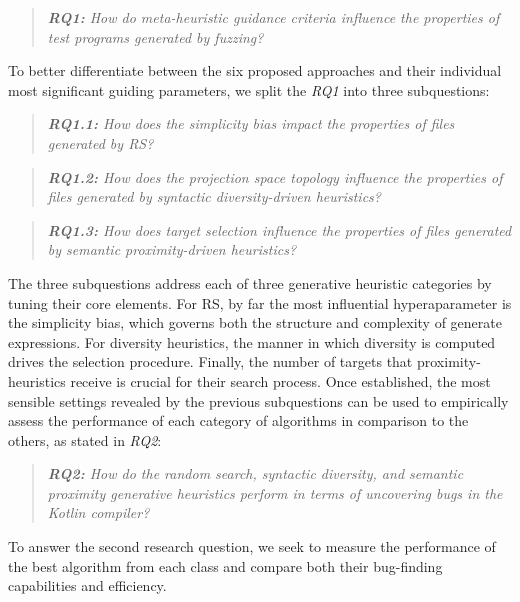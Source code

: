 \begin{quote}
\centering 
\emph{\textbf{RQ1:} How do meta-heuristic guidance
criteria influence the properties of test programs
generated by fuzzing?}
\end{quote}

To better differentiate between the six proposed approaches and their
individual most significant guiding parameters, we split the \textit{RQ1}
into three subquestions:

\begin{quote}
\centering 
\emph{\textbf{RQ1.1:} How does the simplicity bias
impact the properties of files generated by \gls{RS}?}
\end{quote}

\begin{quote}
\centering 
\emph{\textbf{RQ1.2:} How does the projection space
topology influence the properties of files generated
by syntactic diversity-driven heuristics?}
\end{quote}

\begin{quote}
\centering 
\emph{\textbf{RQ1.3:} How does target selection
influence the properties of files generated
by semantic proximity-driven heuristics?}
\end{quote}

The three subquestions address each of three generative
heuristic categories by tuning their core elements.
For \gls{RS}, by far the most influential hyperaparameter is
the simplicity bias, which governs both the structure and complexity of generate expressions.
For diversity heuristics, the manner in which diversity is computed drives the selection procedure.
Finally, the number of targets that proximity-heuristics receive is crucial for their search process.
Once established, the most sensible settings revealed by the previous subquestions can be used
to empirically assess the performance of each category of algorithms in comparison to the others,
as stated in \textit{RQ2}:

\begin{quote}
\centering 
\emph{\textbf{RQ2:} How do the random search, syntactic
diversity, and semantic proximity generative heuristics
perform in terms of uncovering bugs in the Kotlin compiler?}
\end{quote}

To answer the second research question, we seek to measure
the performance of the best algorithm from each class and compare
both their bug-finding capabilities and efficiency.

